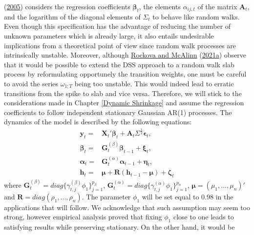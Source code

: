 \documentclass[
  12pt,
]{book}
\theoremstyle{break}
\theoremstyle{nonumberplain}
\begin{document}
(\protect\hyperlink{ref-Primicieri_2005}{2005}) considers the regression
coefficients \(\boldsymbol{\beta}_{t}\), the elements \(\alpha_{ij,t}\)
of the matrix \(\boldsymbol{A}_{t}\), and the logarithm of the diagonal
elements of \(\Sigma_{t}\) to behave like random walks. Even though this
specification has the advantage of reducing the number of unknown
parameters which is already large, it also entails undesirable
implications from a theoretical point of view since random walk
processes are intrinsically unstable. Moreover, although
\protect\hyperlink{ref-rockova_mcalinn_2021}{Rockova and McAlinn}
(\protect\hyperlink{ref-rockova_mcalinn_2021}{2021a}) observe that it
would be possible to extend the DSS approach to a random walk slab
process by reformulating opportunely the transition weights, one must be
careful to avoid the series \(\omega_{1:T}\) being too unstable. This
would indeed lead to erratic transitions from the spike to slab and vice
versa. Therefore, we will stick to the considerations made in Chapter
\ref{Dynamic Shrinkage} and assume the regression coefficients to follow
independent stationary Gaussian AR(1) processes. The dynamics of the
model is described by the following equations: \begin{equation}
\begin{aligned}\label{EQ:dmodel}
\boldsymbol{y}_{t} = & \boldsymbol{X}_{t}'\boldsymbol{\beta}_{t}+\boldsymbol{A}_{t}\Sigma^{\frac{1}{2}} \boldsymbol{\epsilon}_{t},\\
\boldsymbol{\beta}_{t} = & \boldsymbol{G}_{t}^{(\beta)}\boldsymbol{\beta}_{t-1}+\boldsymbol{\xi}_{t},\\
\boldsymbol{\alpha}_{t} = & \boldsymbol{G}_{t}^{(\alpha)}\boldsymbol{\alpha}_{t-1}+\boldsymbol{\eta}_{t},\\
\boldsymbol{h}_{t} = & \boldsymbol{\mu} + \boldsymbol{R}(\boldsymbol{h}_{t-1}-\boldsymbol{\mu})+\boldsymbol{\zeta}_{t}
\end{aligned}
\end{equation} where
\(\boldsymbol{G}_{t}^{(\beta)}=diag\{\gamma_{t,j}^{(\beta)}\phi_{1}\}_{j=1}^{p_\beta}\),
\(\boldsymbol{G}_{t}^{(\alpha)}=diag\{\gamma_{t,j}^{(\alpha)}\phi_{1}\}_{j=1}^{p_\alpha}\),
\(\boldsymbol{\mu}=(\mu_{1},...,\mu_{n})'\) and
\(\boldsymbol{R}=diag(\rho_1,...,\rho_n)\). The parameter \(\phi_1\)
will be set equal to 0.98 in the applications that will follow. We
acknowledge that such assumption may seem too strong, however empirical
analysis proved that fixing \(\phi_1\) close to one leads to satisfying
results while preserving stationary. On the other hand, it would be
\end{document}
